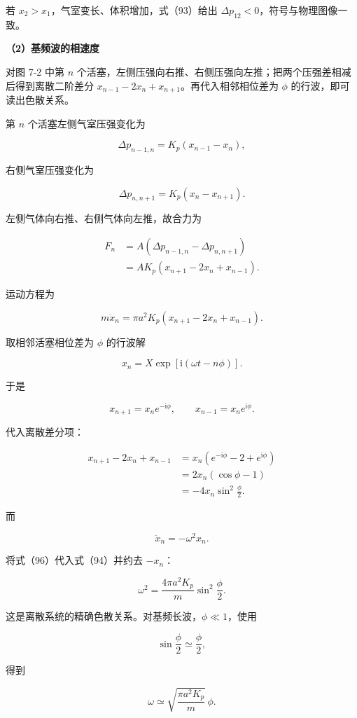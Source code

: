 \documentclass[12pt,a4paper,UTF8]{ctexart}
\begin{document}
若 \(x_2>x_1\)，气室变长、体积增加，式（93）给出
\(\Delta p_{12}<0\)，符号与物理图像一致。

\textbf{（2）基频波的相速度}

对图 7-2 中第 \(n\)
个活塞，左侧压强向右推、右侧压强向左推；把两个压强差相减后得到离散二阶差分
\(x_{n-1}-2x_n+x_{n+1}\)。再代入相邻相位差为 \(\phi\)
的行波，即可读出色散关系。

第 \(n\) 个活塞左侧气室压强变化为

\[\Delta p_{n-1,n}=K_p(x_{n-1}-x_n),\]

右侧气室压强变化为

\[\Delta p_{n,n+1}=K_p(x_n-x_{n+1}).\]

左侧气体向右推、右侧气体向左推，故合力为

\[\begin{aligned}
F_n
&=A\left(\Delta p_{n-1,n}-\Delta p_{n,n+1}\right)\\
&=AK_p\left(x_{n+1}-2x_n+x_{n-1}\right).
\end{aligned}\]

运动方程为

\[m\ddot x_n=\pi a^2K_p
\left(x_{n+1}-2x_n+x_{n-1}\right). \tag{94}\]

取相邻活塞相位差为 \(\phi\) 的行波解

\[x_n=X\exp[\mathrm i(\omega t-n\phi)]. \tag{95}\]

于是

\[x_{n+1}=x_ne^{-\mathrm i\phi},\qquad
x_{n-1}=x_ne^{\mathrm i\phi}.\]

代入离散差分项：

\[\begin{aligned}
x_{n+1}-2x_n+x_{n-1}
&=x_n(e^{-\mathrm i\phi}-2+e^{\mathrm i\phi})\\
&=2x_n(\cos\phi-1)\\
&=-4x_n\sin^2\frac\phi2.
\end{aligned} \tag{96}\]

而

\[\ddot x_n=-\omega^2x_n.\]

将式（96）代入式（94）并约去 \(-x_n\)：

\[\omega^2=\frac{4\pi a^2K_p}{m}\sin^2\frac\phi2. \tag{97}\]

这是离散系统的精确色散关系。对基频长波，\(\phi\ll1\)，使用

\[\sin\frac\phi2\simeq\frac\phi2,\]

得到

\[\omega\simeq\sqrt{\frac{\pi a^2K_p}{m}}\,\phi. \tag{98}\]
\end{document}
